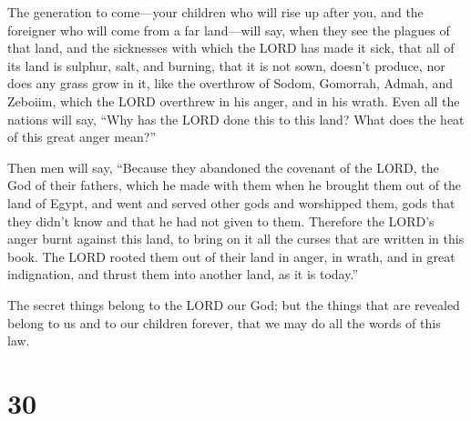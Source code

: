  The generation to come---your children who will rise up
after you, and the foreigner who will come from a far land---will say,
when they see the plagues of that land, and the sicknesses with which
the LORD has made it sick,  that all of its land is
sulphur, salt, and burning, that it is not sown, doesn't produce, nor
does any grass grow in it, like the overthrow of Sodom, Gomorrah, Admah,
and Zeboiim, which the LORD overthrew in his anger, and in his wrath.
 Even all the nations will say, ``Why has the LORD done
this to this land? What does the heat of this great anger mean?''

 Then men will say, ``Because they abandoned the covenant
of the LORD, the God of their fathers, which he made with them when he
brought them out of the land of Egypt,  and went and served
other gods and worshipped them, gods that they didn't know and that he
had not given to them.  Therefore the LORD's anger burnt
against this land, to bring on it all the curses that are written in
this book.  The LORD rooted them out of their land in
anger, in wrath, and in great indignation, and thrust them into another
land, as it is today.''

 The secret things belong to the LORD our God; but the
things that are revealed belong to us and to our children forever, that
we may do all the words of this law.

\hypertarget{section-29}{%
\section{30}\label{section-29}}

